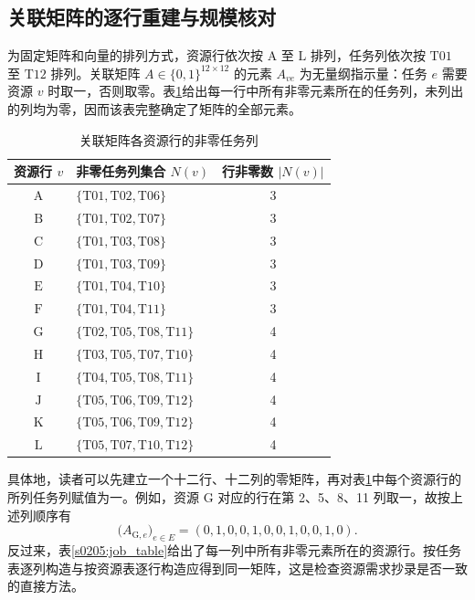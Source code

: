 \subsection{关联矩阵的逐行重建与规模核对}

为固定矩阵和向量的排列方式，资源行依次按 $\mathrm{A}$ 至 $\mathrm{L}$ 排列，任务列依次按 $\mathrm{T01}$ 至 $\mathrm{T12}$ 排列。关联矩阵 $A\in\{0,1\}^{12\times12}$ 的元素 $A_{ve}$ 为无量纲指示量：任务 $e$ 需要资源 $v$ 时取一，否则取零。表\ref{s0205:incidence_rows}给出每一行中所有非零元素所在的任务列，未列出的列均为零，因而该表完整确定了矩阵的全部元素。

\begin{table}[htbp]
 \centering
 \caption{关联矩阵各资源行的非零任务列}
 \label{s0205:incidence_rows}
 \begin{tabular}{clc}
  \toprule
  资源行 $v$ & 非零任务列集合 $N(v)$ & 行非零数 $|N(v)|$\\
  \midrule
  $\mathrm{A}$ & $\{\mathrm{T01},\mathrm{T02},\mathrm{T06}\}$ & 3\\
  $\mathrm{B}$ & $\{\mathrm{T01},\mathrm{T02},\mathrm{T07}\}$ & 3\\
  $\mathrm{C}$ & $\{\mathrm{T01},\mathrm{T03},\mathrm{T08}\}$ & 3\\
  $\mathrm{D}$ & $\{\mathrm{T01},\mathrm{T03},\mathrm{T09}\}$ & 3\\
  $\mathrm{E}$ & $\{\mathrm{T01},\mathrm{T04},\mathrm{T10}\}$ & 3\\
  $\mathrm{F}$ & $\{\mathrm{T01},\mathrm{T04},\mathrm{T11}\}$ & 3\\
  $\mathrm{G}$ & $\{\mathrm{T02},\mathrm{T05},\mathrm{T08},\mathrm{T11}\}$ & 4\\
  $\mathrm{H}$ & $\{\mathrm{T03},\mathrm{T05},\mathrm{T07},\mathrm{T10}\}$ & 4\\
  $\mathrm{I}$ & $\{\mathrm{T04},\mathrm{T05},\mathrm{T08},\mathrm{T11}\}$ & 4\\
  $\mathrm{J}$ & $\{\mathrm{T05},\mathrm{T06},\mathrm{T09},\mathrm{T12}\}$ & 4\\
  $\mathrm{K}$ & $\{\mathrm{T05},\mathrm{T06},\mathrm{T09},\mathrm{T12}\}$ & 4\\
  $\mathrm{L}$ & $\{\mathrm{T05},\mathrm{T07},\mathrm{T10},\mathrm{T12}\}$ & 4\\
  \bottomrule
 \end{tabular}
\end{table}

具体地，读者可以先建立一个十二行、十二列的零矩阵，再对表\ref{s0205:incidence_rows}中每个资源行的所列任务列赋值为一。例如，资源 $\mathrm{G}$ 对应的行在第 2、5、8、11 列取一，故按上述列顺序有
\begin{equation}
 \bigl(A_{\mathrm{G},e}\bigr)_{e\in E}
 =(0,1,0,0,1,0,0,1,0,0,1,0).
 \label{s0205:row_g}
\end{equation}
反过来，表\ref{s0205:job_table}给出了每一列中所有非零元素所在的资源行。按任务表逐列构造与按资源表逐行构造应得到同一矩阵，这是检查资源需求抄录是否一致的直接方法。

